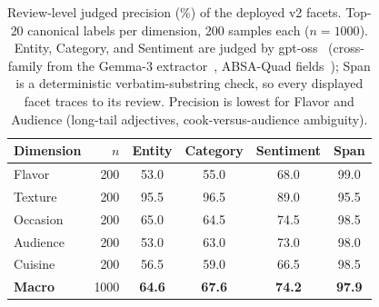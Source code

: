 \begin{table}[t]
\centering
\small
\setlength{\tabcolsep}{5pt}
\begin{tabular}{@{}lrcccc@{}}
\toprule
\textbf{Dimension} & $n$ & \textbf{Entity} & \textbf{Category} & \textbf{Sentiment} & \textbf{Span} \\
\midrule
Flavor & 200 & 53.0 & 55.0 & 68.0 & 99.0 \\
Texture & 200 & 95.5 & 96.5 & 89.0 & 95.5 \\
Occasion & 200 & 65.0 & 64.5 & 74.5 & 98.5 \\
Audience & 200 & 53.0 & 63.0 & 73.0 & 98.0 \\
Cuisine & 200 & 56.5 & 59.0 & 66.5 & 98.5 \\
\midrule
\textbf{Macro} & 1000 & \textbf{64.6} & \textbf{67.6} & \textbf{74.2} & \textbf{97.9} \\
\bottomrule
\end{tabular}
\caption{Review-level judged precision (\%) of the deployed v2 facets. Top-20 canonical labels per dimension, 200 samples each ($n=1000$). Entity, Category, and Sentiment are judged by gpt-oss~\cite{openai2025gptoss} (cross-family from the Gemma-3 extractor~\cite{zheng2024judging}, ABSA-Quad fields~\cite{cai2021aspect}); Span is a deterministic verbatim-substring check, so every displayed facet traces to its review. Precision is lowest for Flavor and Audience (long-tail adjectives, cook-versus-audience ambiguity).}
\label{tab:precision-top20}
\end{table}
